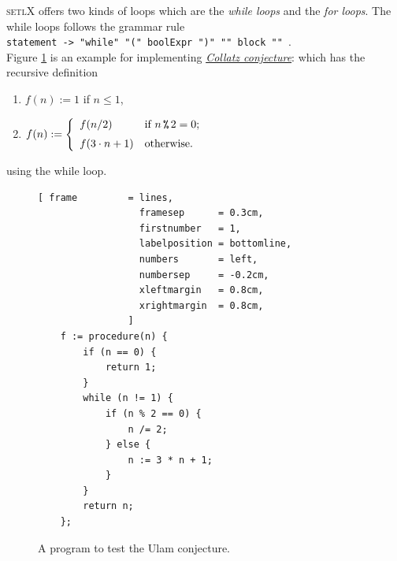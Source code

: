 \documentclass[11pt]{article}
\begin{document}
\textsc{setlX} offers two kinds of loops which are the \textsl{while loops} and the \textsl{for loops}. The while loops follows the grammar rule
\\[0.2cm]
\hspace*{1.3cm}
\texttt{statement -> "while" "(" boolExpr ")" "{" block "}" }.
\\[0.2cm]
Figure \ref{fig:ulam.stlx} is an example for implementing \href{http://en.wikipedia.org/wiki/Collatz_conjecture}{\emph{Collatz conjecture}}: which has the recursive definition
\begin{enumerate}
\item $f(n) := 1$ \hspace*{2.13cm} if $n \leq 1$,
\item $f(n) := \left\{
       \begin{array}[c]{ll}
         f(n/2)           & \mbox{if $n \,\texttt{\symbol{37}}\, 2 = 0$;} \\[0.2cm]  
         f(3 \cdot n + 1) & \mbox{otherwise.} 
       \end{array}
       \right.
      $ 
\end{enumerate}
using the while loop.
\begin{figure}[!ht]
\centering
\begin{Verbatim}[ frame         = lines, 
                  framesep      = 0.3cm, 
                  firstnumber   = 1,
                  labelposition = bottomline,
                  numbers       = left,
                  numbersep     = -0.2cm,
                  xleftmargin   = 0.8cm,
                  xrightmargin  = 0.8cm,
                ]
    f := procedure(n) {
        if (n == 0) {
            return 1;   
        }
        while (n != 1) {
            if (n % 2 == 0) {
                n /= 2;
            } else {
                n := 3 * n + 1;
            }
        }
        return n;
    };
\end{Verbatim}
\vspace*{-0.3cm}
\caption{A program to test the Ulam conjecture.}
\label{fig:ulam.stlx}
\end{figure}
\end{document}

